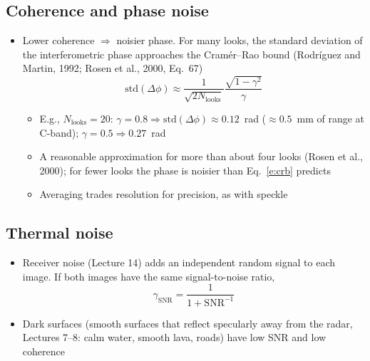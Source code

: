 \documentclass[11pt, oneside]{article}
\newcommand{\Nlooks}{N_\mathrm{looks}}
\begin{document}
\subsection{Coherence and phase noise}
\label{s:phasenoise}

\begin{itemize}
	\item Lower coherence $\Rightarrow$ noisier phase. For many looks, the standard deviation of the interferometric phase approaches the Cram\'er--Rao bound (Rodr\'iguez and Martin, 1992; Rosen et al., 2000, Eq.~67)
	\begin{equation}
		\label{e:crb}
		\mathrm{std}(\Delta\phi) \approx \frac{1}{\sqrt{2\Nlooks}}\frac{\sqrt{1 - \gamma^2}}{\gamma}
	\end{equation}
	\begin{itemize}
		\item E.g., $\Nlooks = 20$: $\gamma = 0.8 \Rightarrow \mathrm{std}(\Delta\phi) \approx 0.12$~rad ($\approx 0.5$~mm of range at C-band); $\gamma = 0.5 \Rightarrow 0.27$~rad
		\item A reasonable approximation for more than about four looks (Rosen et al., 2000); for fewer looks the phase is noisier than Eq.~\eqref{e:crb} predicts
		\item[$\Rightarrow$] Averaging trades resolution for precision, as with speckle
	\end{itemize}
\end{itemize}

\subsection{Thermal noise}

\begin{itemize}
	\item Receiver noise (Lecture 14) adds an independent random signal to each image. If both images have the same signal-to-noise ratio,
	\begin{equation}
		\label{e:gsnr}
		\gamma_\mathrm{SNR} = \frac{1}{1 + \mathrm{SNR}^{-1}}
	\end{equation}
	\item Dark surfaces (smooth surfaces that reflect specularly away from the radar, Lectures 7--8: calm water, smooth lava, roads) have low SNR and low coherence
\end{itemize}
\end{document}
